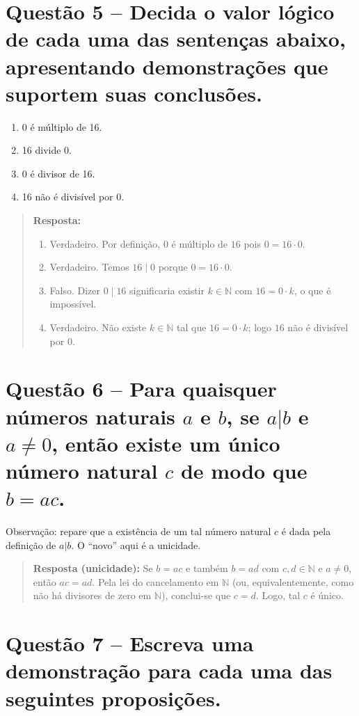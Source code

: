 \documentclass[12pt,a4paper]{article}
\newcommand{\answer}[1]{\begin{quote}#1\end{quote}}
\begin{document}
\section*{Questão 5 -- Decida o valor lógico de cada uma das sentenças abaixo, apresentando demonstrações que suportem suas conclusões.}
    \begin{enumerate}[label= (\alph*)]
        \item 0 é múltiplo de 16.
        \item 16 divide 0.
        \item 0 é divisor de 16.
        \item 16 não é divisível por 0.
    \end{enumerate}
    \answer{\textbf{Resposta:}
        \begin{enumerate}[label= (\alph*)]
            \item Verdadeiro. Por definição, $0$ é múltiplo de $16$ pois $0 = 16 \cdot 0$.
            \item Verdadeiro. Temos $16 \mid 0$ porque $0 = 16 \cdot 0$.
            \item Falso. Dizer $0 \mid 16$ significaria existir $k \in \mathbb{N}$ com $16 = 0 \cdot k$, o que é impossível.
            \item Verdadeiro. Não existe $k \in \mathbb{N}$ tal que $16 = 0 \cdot k$; logo $16$ não é divisível por $0$.
        \end{enumerate}
    }

\section*{Questão 6 -- Para quaisquer números naturais $a$ e $b$, se $a | b$ e $a \neq 0$, então existe um único número natural $c$ de modo que $b = ac$.}
Observação: repare que a existência de um tal número natural $c$ é dada pela definição de $a | b$. O
“novo” aqui é a unicidade.
    \answer{\textbf{Resposta (unicidade):}
        Se $b = a c$ e também $b = a d$ com $c,d \in \mathbb{N}$ e $a \ne 0$, então $a c = a d$. Pela lei do cancelamento em $\mathbb{N}$ (ou, equivalentemente, como não há divisores de zero em $\mathbb{N}$), conclui-se que $c = d$. Logo, tal $c$ é único.
    }

\section*{Questão 7 -- Escreva uma demonstração para cada uma das seguintes proposições.}
\end{document}
